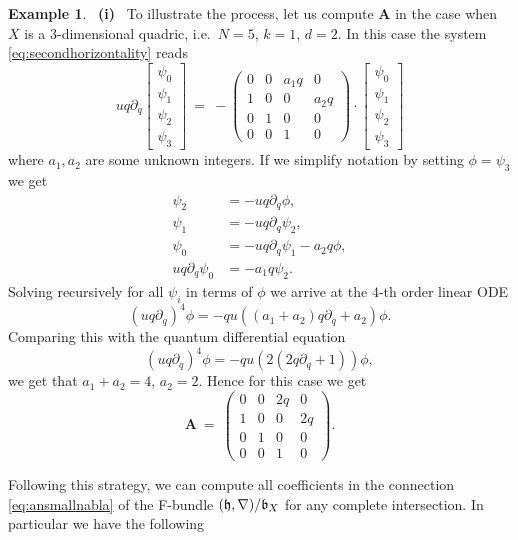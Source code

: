 \documentclass[twoside,leqno]{article}
\numberwithin{equation}{section}
\theoremstyle{plain}
\theoremstyle{definition}
\newtheorem{example}[equation]{Example}
\begin{document}
\begin{example} \label{ex:quadrics_and_cubics}
\ {\bfseries (i)} \ To illustrate the process, let us compute $\mathbf{A}$ in the case when $X$ is a 
$3$-dimensional quadric, i.e.\ $N = 5$, $k = 1$, $d = 2$. In this case the system \eqref{eq:secondhorizontality} reads
\[
uq\partial_{q} \begin{bmatrix} \psi_{0} \\ \psi_{1} \\ \psi_{2} \\ \psi_{3} \end{bmatrix} \ = \ 
- \begin{pmatrix}
0 & 0 & a_{1}q & 0 \\
1 & 0 & 0 & a_{2}q \\
0 & 1 & 0 & 0 \\
0 & 0 & 1 & 0
\end{pmatrix}\cdot \begin{bmatrix} \psi_{0} \\ \psi_{1} \\ \psi_{2} \\ \psi_{3} \end{bmatrix}
\]
where $a_{1}, a_{2}$ are some unknown integers. 
If we simplify notation by setting $\phi = \psi_{3}$ we get 
\[
\begin{aligned}
\psi_{2} & = - uq\partial_{q}\phi, \\
\psi_{1} & = - uq\partial_{q}\psi_{2}, \\
\psi_{0} & = - uq\partial_{q}\psi_{1} - a_{2}q\phi, \\
uq\partial_{q}\psi_{0} & = - a_{1}q\psi_{2}.
\end{aligned}
\]
Solving recursively for all $\psi_{i}$ in terms of $\phi$ we arrive at the $4$-th order linear ODE
\[
(uq\partial_{q})^4\phi = -qu((a_{1}+a_{2})q\partial_{q} + a_{2})\phi.
\]
Comparing this with the quantum differential equation 
\[
(uq\partial_{q})^4\phi = -qu(2(2q\partial_{q} + 1))\phi,
\]
we get that $a_{1}+a_{2} = 4$, $a_{2} =2$. Hence
for this case we get 
\[
\mathbf{A} \ = \  \begin{pmatrix}
0 & 0 & 2q & 0 \\
1 & 0 & 0 & 2q \\
0 & 1 & 0 & 0 \\
0 & 0 & 1 & 0
\end{pmatrix}.
\]

\medskip

Following this strategy, we can compute all coefficients in the connection \eqref{eq:ansmallnabla} of the F-bundle $(\mathfrak{h},\nabla)/\mathfrak{b}_{X}$ for any complete intersection. In particular we have the following


\end{example}
\end{document}
